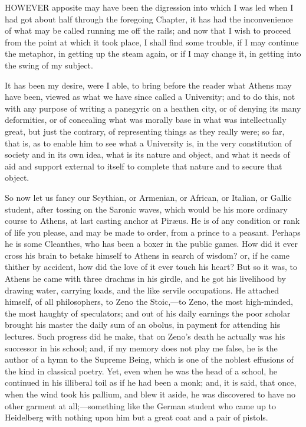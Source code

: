 
HOWEVER apposite may have been the
digression into which I was led when I had got about half through the
foregoing Chapter, it has had the inconvenience of what may be called
running me off the rails; and now that I wish to proceed from the
point at which it took place, I shall find some trouble, if I may
continue the metaphor, in getting up the steam again, or if I may
change it, in getting into the swing of my subject.

It has been my desire, were I able, to bring before the reader what
Athens may have been, viewed as what we have since called a
University; and to do this, not with any purpose of writing a
panegyric on a heathen city, or of denying its many deformities, or of
concealing what was morally base in what was intellectually great, but
just the contrary, of representing things as they really were; so far,
that is, as to enable him to see what a University is, in the very
constitution of society and in its own idea, what is its nature and
object, and what it needs of aid and support external to itself to
complete that nature and to secure that object.

So now let us fancy our Scythian, or Armenian, or African, or
Italian, or Gallic student, after tossing on the Saronic waves, which
would be his more ordinary course to Athens, at last casting anchor at
Piræus. He is of any condition or rank of life you please, and
may be made to order, from a prince to a peasant. Perhaps he is some
Cleanthes, who has been a boxer in the public games. How did it ever
cross his brain to betake himself to Athens in search of wisdom? or,
if he came thither by accident, how did the love of it ever touch his
heart? But so it was, to Athens he came with three drachms in his
girdle, and he got his livelihood by drawing water, carrying loads,
and the like servile occupations. He attached himself, of all
philosophers, to Zeno the Stoic,—to Zeno, the most high-minded, the
most haughty of speculators; and out of his daily earnings the poor
scholar brought his master the daily sum of an obolus, in payment for
attending his lectures. Such progress did he make, that on Zeno's
death he actually was his successor in his school; and, if my memory
does not play me false, he is the author of a hymn to the Supreme
Being, which is one of the noblest effusions of the kind in classical
poetry. Yet, even when he was the head of a school, he continued in
his illiberal toil as if he had been a monk; and, it is said, that
once, when the wind took his pallium, and blew it aside, he was
discovered to have no other garment at all;—something like the
German student who came up to Heidelberg with nothing upon him but a
great coat and a pair of pistols.

